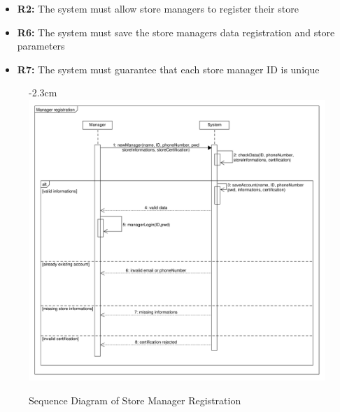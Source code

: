 \documentclass{article}
\begin{document}
\begin{center}
\begin{adjustwidth}{-2.8cm}{}
\begin{tabular}[h!]{|m{7.5em}|m{36em}|}
					\end{tabular}
					\end{adjustwidth}
					
					\begin{itemize}
					\bigskip
					\bigskip
					\bigskip
					 {\bfseries Required functional requirements: }
					\item {\bfseries R2: } The system must allow store managers to register their store
					\item {\bfseries R6: } The system must save the store managers data registration and store parameters
					\item {\bfseries R7: } The system must guarantee that each store manager ID is unique

					\end{itemize}
				
					
						
							\begin{figure}
								\begin{adjustwidth} {-2.3cm}{}
									\centering
									\includegraphics[scale=0.5]{SD/2_storeManagerRegistration.pdf}\\
									\caption{Sequence Diagram of Store Manager Registration}
								\end{adjustwidth}
							\end{figure}

						
						
					

				\end{center}
\end{document}
